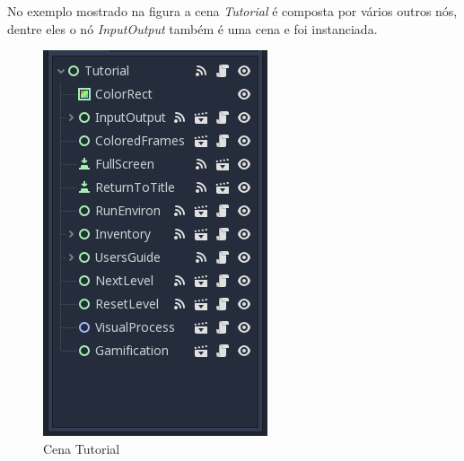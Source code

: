 No exemplo mostrado na figura a cena \textit{Tutorial} é composta por vários
outros nós, dentre eles o nó \textit{InputOutput} também é uma cena e foi
instanciada.

\begin{minipage}[t]{0.4\textwidth}
    \begin{figure}[H]
        \includegraphics[width=\textwidth]{../figuras/cena_tutorial.png}
        \caption{Cena Tutorial}
    \end{figure}
\end{minipage}%
\begin{minipage}{0.05\textwidth}
    \hfill
\end{minipage}%

